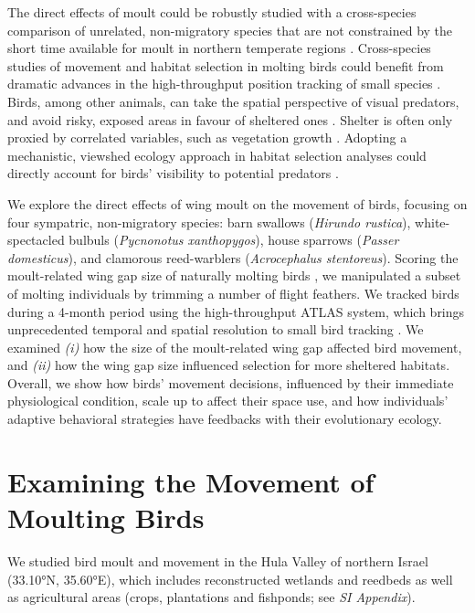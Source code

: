 The direct effects of moult could be robustly studied with a cross-species comparison of unrelated, non-migratory species that are not constrained by the short time available for moult in northern temperate regions \cite{ginn1983,jenni2020}.
Cross-species studies of movement and habitat selection in molting birds could benefit from dramatic advances in the high-throughput position tracking of small species \cite{toledo2020,nathan2022}.
Birds, among other animals, can take the spatial perspective of visual predators, and avoid risky, exposed areas in favour of sheltered ones \cite{hampton1994,emery2000,krams2001,davidson2016,krams2020}.
Shelter is often only proxied by correlated variables, such as vegetation growth \cite{pettorelli2011}. 
Adopting a mechanistic, viewshed ecology approach \cite{olsoy2015,aben2018,aben2021} in habitat selection analyses could directly account for birds' visibility to potential predators \cite{olsoy2015,aben2018,aben2021}.

We explore the direct effects of wing moult on the movement of birds, focusing on four sympatric, non-migratory species: barn swallows (\textit{Hirundo rustica}), white-spectacled bulbuls (\textit{Pycnonotus xanthopygos}), house sparrows (\textit{Passer domesticus}), and clamorous reed-warblers (\textit{Acrocephalus stentoreus}).
Scoring the moult-related wing gap size of naturally molting birds \citep{lind2001,kiat2016}, we manipulated a subset of molting individuals by trimming a number of flight feathers.
We tracked birds during a 4-month period using the high-throughput ATLAS system, which brings unprecedented temporal and spatial resolution to small bird tracking \citep{toledo2014,weiser2016,toledo2020,nathan2022,beardsworth2022mee}.
We examined \textit{(i)} how the size of the moult-related wing gap affected bird movement, and \textit{(ii)} how the wing gap size influenced selection for more sheltered habitats.
Overall, we show how birds' movement decisions, influenced by their immediate physiological condition, scale up to affect their space use, and how individuals' adaptive behavioral strategies have feedbacks with their evolutionary ecology.

\section*{Examining the Movement of Moulting Birds}

We studied bird moult and movement in the Hula Valley of northern Israel (33.10°N, 35.60°E), which includes reconstructed wetlands and reedbeds as well as agricultural areas (crops, plantations and fishponds; see \textit{SI Appendix}).

